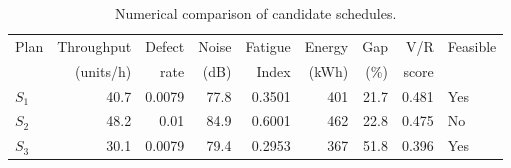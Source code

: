 \begin{table}[htbp]
\centering
\caption{Numerical comparison of candidate schedules.}
\label{tab:numerical-sim}
\small
\begin{tabular}{@{}lrrrrrrrl@{}}
\toprule
Plan & Throughput & Defect & Noise & Fatigue & Energy & Gap & V/R & Feasible \\
     & (units/h)  & rate   & (dB)  & Index   & (kWh)  & (\%) & score &         \\
\midrule
$S_{1}$ & 40.7 & 0.0079 & 77.8 & 0.3501 & 401 & 21.7 & 0.481 & Yes \\
$S_{2}$ & 48.2 & 0.01 & 84.9 & 0.6001 & 462 & 22.8 & 0.475 & No \\
$S_{3}$ & 30.1 & 0.0079 & 79.4 & 0.2953 & 367 & 51.8 & 0.396 & Yes \\
\bottomrule
\end{tabular}
\end{table}
